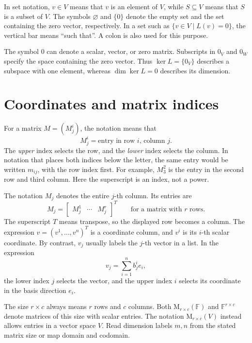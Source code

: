 In set notation, \(v\in V\) means that \(v\) is an element of \(V\),
while \(S\subseteq V\) means that \(S\) is a subset of \(V\).
The symbols \(\varnothing\) and \(\{0\}\) denote the empty set and
the set containing the zero vector, respectively. In a set such as
\(\{v\in V\mid L(v)=0\}\), the vertical bar means ``such that''.
A colon is also used for this purpose.

The symbol \(0\) can denote a scalar, vector, or zero matrix. Subscripts
in \(0_V\) and \(0_W\) specify the space containing the zero vector.
Thus \(\ker L=\{0_V\}\) describes a subspace with one element,
whereas \(\dim\ker L=0\) describes its dimension.

\section{Coordinates and matrix indices}
\label{sec:appendix:notation-indices}

For a matrix \(M=(M^i_j)\), the notation means that
\[
  M^i_j=\text{entry in row \(i\), column \(j\)}.
\]
The \emph{upper} index selects the row, and the \emph{lower} index selects
the column. In notation that places both indices below the letter, the
same entry would be written \(m_{ij}\), with the row index first.
For example, \(M^2_3\) is the entry in the second row and third column.
Here the superscript is an index, not a power.

The notation \(M_j\) denotes the entire \(j\)-th column. Its entries are
\[
  M_j=\begin{bmatrix}M^1_j&\cdots&M^r_j\end{bmatrix}^{T}
  \qquad\text{for a matrix with \(r\) rows.}
\]
The superscript \(T\) means transpose, so the displayed row becomes a
column. The expression \(v=(v^1,\ldots,v^n)^T\) is a coordinate column, and
\(v^i\) is its \(i\)-th scalar coordinate. By contrast, \(v_j\) usually
labels the \(j\)-th vector in a list. In the expression
\[
  v_j=\sum_{i=1}^n b^i_j e_i,
\]
the lower index \(j\) selects the vector, and the upper index \(i\)
selects its coordinate in the basis direction \(e_i\).

The size \(r\times c\) always means \(r\) rows and \(c\) columns.
Both \(\mathrm M_{r\times c}(\mathbb F)\) and
\(\mathbb F^{r\times c}\) denote matrices of this size with scalar
entries. The notation \(\mathrm M_{r\times c}(V)\) instead allows
entries in a vector space \(V\). Read dimension labels \(m,n\) from the
stated matrix size or map domain and codomain.

